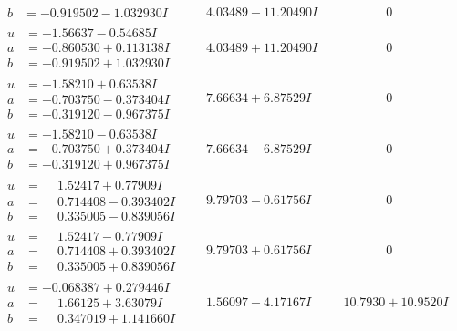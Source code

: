 \documentclass[1p]{elsarticle_modified}
\theoremstyle{definition}
\begin{document}
$$\begin{array}{c|c|c}
\begin{aligned}
b &= -0.919502 - 1.032930 I\end{aligned}
 & \phantom{-}4.03489 - 11.20490 I & \phantom{-0.000000 } 0 \\ \hline\begin{aligned}
u &= -1.56637 - 0.54685 I \\
a &= -0.860530 + 0.113138 I \\
b &= -0.919502 + 1.032930 I\end{aligned}
 & \phantom{-}4.03489 + 11.20490 I & \phantom{-0.000000 } 0 \\ \hline\begin{aligned}
u &= -1.58210 + 0.63538 I \\
a &= -0.703750 - 0.373404 I \\
b &= -0.319120 - 0.967375 I\end{aligned}
 & \phantom{-}7.66634 + 6.87529 I & \phantom{-0.000000 } 0 \\ \hline\begin{aligned}
u &= -1.58210 - 0.63538 I \\
a &= -0.703750 + 0.373404 I \\
b &= -0.319120 + 0.967375 I\end{aligned}
 & \phantom{-}7.66634 - 6.87529 I & \phantom{-0.000000 } 0 \\ \hline\begin{aligned}
u &= \phantom{-}1.52417 + 0.77909 I \\
a &= \phantom{-}0.714408 - 0.393402 I \\
b &= \phantom{-}0.335005 - 0.839056 I\end{aligned}
 & \phantom{-}9.79703 - 0.61756 I & \phantom{-0.000000 } 0 \\ \hline\begin{aligned}
u &= \phantom{-}1.52417 - 0.77909 I \\
a &= \phantom{-}0.714408 + 0.393402 I \\
b &= \phantom{-}0.335005 + 0.839056 I\end{aligned}
 & \phantom{-}9.79703 + 0.61756 I & \phantom{-0.000000 } 0 \\ \hline\begin{aligned}
u &= -0.068387 + 0.279446 I \\
a &= \phantom{-}1.66125 + 3.63079 I \\
b &= \phantom{-}0.347019 + 1.141660 I\end{aligned}
 & \phantom{-}1.56097 - 4.17167 I & \phantom{-}10.7930 + 10.9520 I \\ \hline\begin{aligned}

\end{aligned}
\end{array}$$
\end{document}
